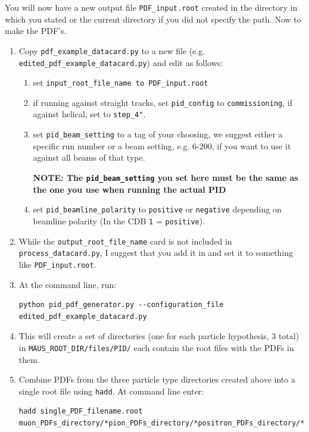 \documentclass[a4paper,10pt]{article}
\begin{document}
You will now have a new output file \texttt{PDF\_input.root} created in the directory in which you stated or the current directory if you did not specify the path.  Now to make the PDF's.

\begin{enumerate}[resume]
\item{Copy \texttt{pdf\_example\_datacard.py} to a new file (e.g. \texttt{edited\_pdf\_example\_datacard.py}) and edit as follows:}
\begin{enumerate}[label=(\alph*)]
\item{set \texttt{input\_root\_file\_name to PDF\_input.root}}
\item{if running against straight tracks, set \texttt{pid\_config} to \texttt{commissioning}, if against helical, set to \texttt{step\_4"}.}
\item{set \texttt{pid\_beam\_setting} to a tag of your choosing, we suggest either a specific run number or a beam setting, e.g. 6-200, if you want to use it against all beams of that type. 

\textbf{NOTE: The \texttt{pid\_beam\_setting} you set here must be the same as the one you use when running the actual PID}}
\item{set \texttt{pid\_beamline\_polarity} to \texttt{positive} or \texttt{negative} depending on beamline polarity (In the CDB \texttt{1} = \texttt{positive}).}
\end{enumerate}
\item{While the \texttt{output\_root\_file\_name} card is not included in \texttt{process\_datacard.py}, I suggest that you add it in and set it to something like \texttt{PDF\_input.root}.}
\item At the command line, run:
\begin{lstlisting}
python pid_pdf_generator.py --configuration_file edited_pdf_example_datacard.py
\end{lstlisting}
\item This will create a set of directories (one for each particle hypothesis, 3 total) in \texttt{MAUS\_ROOT\_DIR/files/PID/} each contain the root files with the PDFs in them.
\item Combine PDFs from the three particle type directories created above into a single root file
using \texttt{hadd}. At command line enter:
\begin{lstlisting}
hadd single_PDF_filename.root muon_PDFs_directory/*pion_PDFs_directory/*positron_PDFs_directory/*
\end{lstlisting}
\end{enumerate}
\end{document}
